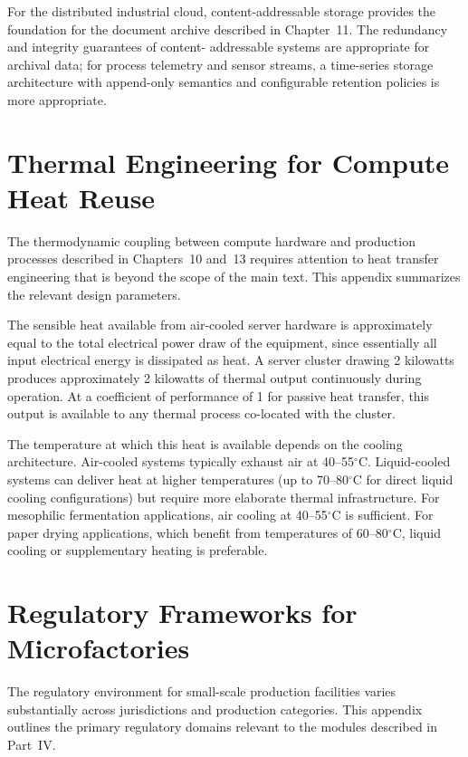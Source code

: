 \documentclass[12pt]{book}
\theoremstyle{definition}
\theoremstyle{remark}
\begin{document}
For the distributed industrial cloud, content-addressable storage
provides the foundation for the document archive described in
Chapter~11. The redundancy and integrity guarantees of content-
addressable systems are appropriate for archival data; for process
telemetry and sensor streams, a time-series storage architecture
with append-only semantics and configurable retention policies is
more appropriate.

\chapter{Thermal Engineering for Compute Heat Reuse}

The thermodynamic coupling between compute hardware and production
processes described in Chapters~10 and~13 requires attention to
heat transfer engineering that is beyond the scope of the main text.
This appendix summarizes the relevant design parameters.

The sensible heat available from air-cooled server hardware is
approximately equal to the total electrical power draw of the
equipment, since essentially all input electrical energy is
dissipated as heat. A server cluster drawing 2 kilowatts produces
approximately 2 kilowatts of thermal output continuously during
operation. At a coefficient of performance of 1 for passive heat
transfer, this output is available to any thermal process co-located
with the cluster.

The temperature at which this heat is available depends on the
cooling architecture. Air-cooled systems typically exhaust air
at 40--55${}^\circ$C. Liquid-cooled systems can deliver heat
at higher temperatures (up to 70--80${}^\circ$C for direct liquid
cooling configurations) but require more elaborate thermal
infrastructure. For mesophilic fermentation applications, air
cooling at 40--55${}^\circ$C is sufficient. For paper drying
applications, which benefit from temperatures of 60--80${}^\circ$C,
liquid cooling or supplementary heating is preferable.

\chapter{Regulatory Frameworks for Microfactories}

The regulatory environment for small-scale production facilities
varies substantially across jurisdictions and production categories.
This appendix outlines the primary regulatory domains relevant to
the modules described in Part~IV.
\end{document}
